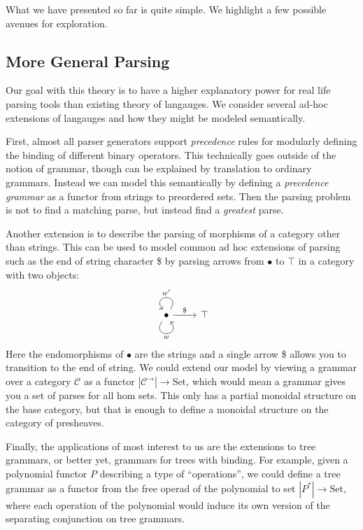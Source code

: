 \documentclass[12pt]{article}
\newcommand{\Set}{\textrm{Set}}
\begin{document}
What we have presented so far is quite simple. We highlight a few
possible avenues for exploration.

\subsection{More General Parsing}

Our goal with this theory is to have a higher explanatory power for
real life parsing tools than existing theory of langauges. We consider
several ad-hoc extensions of langauges and how they might be modeled
semantically.

First, almost all parser generators support \emph{precedence} rules
for modularly defining the binding of different binary operators.
This technically goes outside of the notion of grammar, though can be
explained by translation to ordinary grammars.
%
Instead we can model this semantically by defining a \emph{precedence
grammar} as a functor from strings to preordered sets. Then the
parsing problem is not to find a matching parse, but instead find a
\emph{greatest} parse.

Another extension is to describe the parsing of morphisms of a
category other than strings. This can be used to model common ad hoc
extensions of parsing such as the end of string character \$ by
parsing arrows from $\bullet$ to $\top$ in a category with two
objects:
\[%
\begin{tikzcd}
\bullet \arrow[r, "\$"] \arrow["w"', loop, distance=2em, in=305, out=235] \arrow["w'"', loop, distance=2em, in=125, out=55] & \top
\end{tikzcd}\]
Here the endomorphisms of $\bullet$ are the strings and a single arrow
\$ allows you to transition to the end of string.  We could extend our
model by viewing a grammar over a category $\mathcal C$ as a functor
$|\mathcal C^\to| \to \Set$, which would mean a grammar gives you a
set of parses for all hom sets. This only has a partial monoidal
structure on the base category, but that is enough to define a
monoidal structure on the category of presheaves.

Finally, the applications of most interest to us are the extensions to
tree grammars, or better yet, grammars for trees with binding. For
example, given a polynomial functor $P$ describing a type of
``operations'', we could define a tree grammar as a functor from the
free operad of the polynomial to set $|P^*| \to \Set$, where each
operation of the polynomial would induce its own version of the
separating conjunction on tree grammars.



\end{document}
